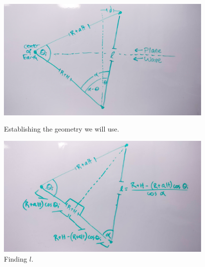 \documentclass[12pt]{article}
\begin{document}
\begin{onehalfspacing}
\begin{figure}
    \centering
    \begin{minipage}{0.48\textwidth}
        \centering
        \includegraphics[width=0.95\textwidth]{prob2b-1} %
        \caption{Establishing the geometry we will use.}
    \end{minipage}\hfill
    \begin{minipage}{0.48\textwidth}
        \centering
        \includegraphics[width=0.95\textwidth]{prob2b-2} %
        \caption{Finding $l$.}
    \end{minipage}
\end{figure}



\iffalse


\end{onehalfspacing}
\end{document}
